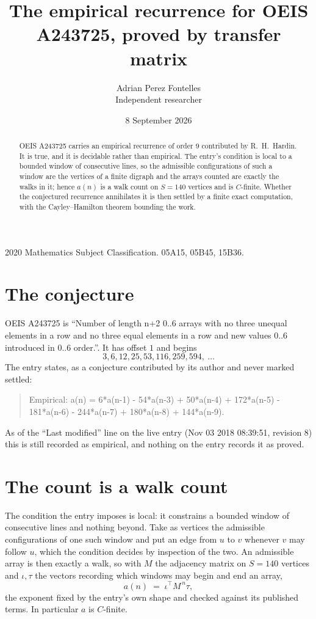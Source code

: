 \documentclass[11pt,a4paper]{article}
\title{The empirical recurrence for OEIS A243725, proved by transfer matrix}
\author{Adrian Perez Fontelles\\ \small Independent researcher}
\date{8 September 2026}
\theoremstyle{plain}
\theoremstyle{definition}
\begin{document}
\maketitle

\begin{abstract}
OEIS A243725 carries an empirical recurrence of order $9$ contributed by R.~H.~Hardin. It is
true, and it is decidable rather than empirical. The entry's condition is local to a bounded window of consecutive lines, so
the admissible configurations of such a window are the vertices of a finite digraph and the
arrays counted are exactly the walks in it; hence $a(n)$ is a walk count on $S=140$ vertices
and is $C$-finite. Whether the conjectured recurrence annihilates it is then settled by a
finite exact computation, with the Cayley--Hamilton theorem bounding the work.
\end{abstract}

\noindent\small 2020 Mathematics Subject Classification. 05A15, 05B45, 15B36.\normalsize

\section{The conjecture}

OEIS A243725 is ``Number of length n+2 0..6 arrays with no three unequal elements in a row and no three equal elements in a row and new values 0..6 introduced in 0..6 order.''. It has offset $1$ and begins
\[
3, 6, 12, 25, 53, 116, 259, 594,\ \dots
\]
The entry states, as a conjecture contributed by its author and never marked settled:
\begin{quote}
Empirical: a(n) = 6*a(n-1) - 54*a(n-3) + 50*a(n-4) + 172*a(n-5) - 181*a(n-6) - 244*a(n-7) + 180*a(n-8) + 144*a(n-9).
\end{quote}
As of the ``Last modified'' line on the live entry (Nov 03 2018 08:39:51, revision 8) this is still
recorded as empirical, and nothing on the entry records it as proved.

\section{The count is a walk count}

The condition the entry imposes is local: it constrains a bounded window of consecutive lines and nothing beyond. Take as
vertices the admissible configurations of one such window and put an edge from $u$ to $v$
whenever $v$ may follow $u$, which the condition decides by inspection of the two. An
admissible array is then exactly a walk, so with $M$ the adjacency matrix on $S=140$ vertices
and $\iota,\tau$ the vectors recording which windows may begin and end an array,
\[
a(n)\;=\;\iota^{\!\top}M^{\,n}\tau ,
\]
the exponent fixed by the entry's own shape and checked against its published terms. In
particular $a$ is $C$-finite.
\end{document}
